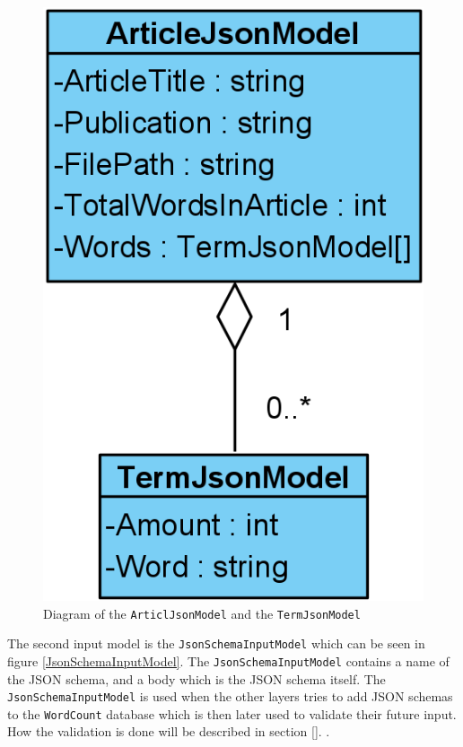 \begin{figure}[H]
    \centering
    \includegraphics[scale=0.5]{Images/jsonArticleModel.PNG}
    \caption{Diagram of the \texttt{ArticlJsonModel} and the \texttt{TermJsonModel}}
    \label{ArticlJsonModel}
\end{figure}
The second input model is the \texttt{JsonSchemaInputModel} which can be seen in figure \ref*{JsonSchemaInputModel}. The \texttt{JsonSchemaInputModel} contains a name of the JSON schema, and a body which is the JSON schema itself. The \texttt{JsonSchemaInputModel} is used when the other layers tries to add JSON schemas to the \texttt{WordCount} database which is then later used to validate their future input. How the validation is done will be described in section \ref*{}. .

